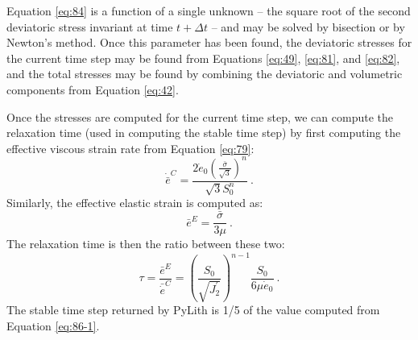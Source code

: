 Equation \ref{eq:84} is a function of a single unknown -- the square
root of the second deviatoric stress invariant at time $t+\Delta t$
-- and may be solved by bisection or by Newton's method. Once this
parameter has been found, the deviatoric stresses for the current
time step may be found from Equations \ref{eq:49}, \ref{eq:81},
and \ref{eq:82}, and the total stresses may be found by combining
the deviatoric and volumetric components from Equation \ref{eq:42}.

Once the stresses are computed for the current time step, we can compute
the relaxation time (used in computing the stable time step) by first
computing the effective viscous strain rate from Equation \ref{eq:79}:
\begin{equation}
\dot{\bar{e}}^{C}=\frac{2\dot{e}_{0}\left(\frac{\bar{\sigma}}{\sqrt{3}}\right)^{n}}{\sqrt{3}S_{0}^{n}}\:.
\end{equation}
Similarly, the effective elastic strain is computed as:
\begin{equation}
\bar{e}^{E}=\frac{\bar{\sigma}}{3\mu}\:.
\end{equation}
The relaxation time is then the ratio between these two:
\begin{equation}
\tau=\frac{\bar{e}^{E}}{\bar{\dot{e}}^{C}}=\left(\frac{S_{0}}{\sqrt{J_{2}^{\prime}}}\right)^{n-1}\frac{S_{0}}{6\mu\dot{e}_{0}}\:.\label{eq:86-1}
\end{equation}
The stable time step returned by PyLith is 1/5 of the value computed
from Equation \ref{eq:86-1}.

